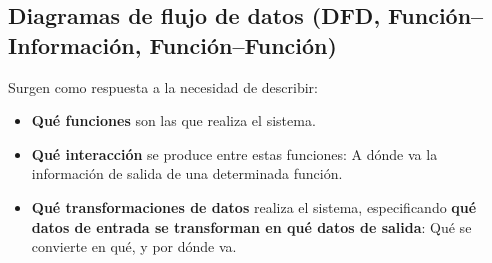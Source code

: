 \begin{table}[ht]
    \centering
    \caption{Diferentes técnicas de especificación}
\end{table}


\subsection{Diagramas de flujo de datos (DFD, Función--Información, Función--Función)}

Surgen como respuesta a la necesidad de describir:

\begin{itemize}
    \item \textbf{Qué funciones} son las que realiza el sistema.
    \item \textbf{Qué interacción} se produce entre estas funciones: A dónde va la información de salida de una determinada función.
    \item \textbf{Qué transformaciones de datos} realiza el sistema, especificando \textbf{qué datos de entrada se transforman en qué datos de salida}: Qué se convierte en qué, y por dónde va.
\end{itemize}

